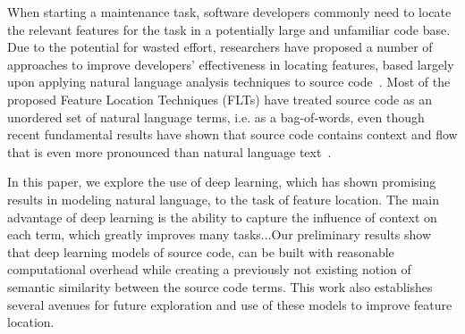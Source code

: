 
% 
%
When starting a maintenance task, software developers commonly need to
locate the relevant features for the task in a potentially large and
unfamiliar code base. Due to the potential for wasted effort,
researchers have proposed a number of approaches to improve
developers' effectiveness in locating features, based largely upon
applying natural language analysis techniques to source
code~\cite{dit's survey}. Most of the proposed Feature Location
Techniques (FLTs) have treated source code as an unordered set of
natural language terms, i.e. as a bag-of-words, even though recent
fundamental results have shown that source code contains context and
flow that is even more pronounced than natural language
text~\cite{naturalness}.


%
%
In this paper, we explore the use of deep learning, which has shown
promising results in modeling natural language, to the task of feature
location. The main advantage of deep learning is the ability to
capture the influence of context on each term, which greatly improves
many tasks...Our preliminary results show that deep learning models of
source code, can be built with reasonable computational overhead while
creating a previously not existing notion of semantic similarity
between the source code terms. This work also establishes several
avenues for future exploration and use of these models to improve
feature location.



